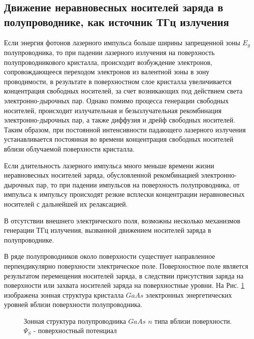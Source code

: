 \documentclass[a4paper,14pt,russian]{extreport}
\begin{document}
			\subsection{Движение неравновесных носителей заряда в полупроводнике, как источник ТГц излучения}
				Если энергия фотонов лазерного импульса больше ширины запрещенной зоны $E_g$ полупроводника, то при падении лазерного излучения на поверхность полупроводникового кристалла, происходит возбуждение электронов, сопровождающееся переходом электронов из валентной зоны в зону проводимости, в результате в поверхностном слое кристалла увеличивается концентрация свободных носителей, за счет возникающих под действием света электронно-дырочных пар. Однако помимо процесса генерации свободных носителей, происходит излучательная и безызлучательная рекомбинация электронно-дырочных пар, а также диффузия и дрейф свободных носителей. Таким образом, при постоянной интенсивности падающего лазерного излучения устанавливается постоянная во времени концентрация свободных носителей вблизи облучаемой поверхности кристалла.\par
				Если длительность лазерного импульса много меньше времени жизни неравновесных носителей заряда, обусловленной рекомбинацией электронно-дырочных пар, то при падении импульсов на поверхность полупроводника, от импульса к импульсу происходят резкие всплески концентрации неравновесных носителей с дальнейшей их релаксацией.\par
				В отсутствии внешнего электрического поля, возможны несколько механизмов генерации ТГц излучения, вызванной движением носителей заряда в полупроводнике.\par
				В ряде полупроводников около поверхности существует направленное перпендикулярно поверхности электрическое поле. Поверхностное поле является результатом перемещения носителей заряда, в следствии присутствия заряда на поверхности или захвата носителей заряда на поверхностные уровни. На Рис.  \ref{ris:GaAsSurfFields} изображена зонная структура кристалла $GaAs$ электронных энергетических уровней вблизи поверхности полупроводника.
				\begin{figure}[h]
					\caption{Зонная структура полупроводника $GaAs$ $n$ типа вблизи поверхности. $\Psi_S$ - поверхностный потенциал}
				\label{ris:GaAsSurfFields}
				\end{figure}
\end{document}
